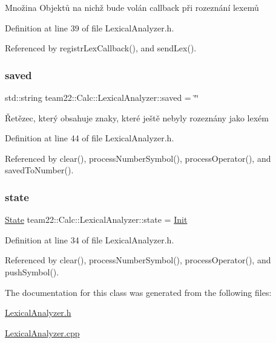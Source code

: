 Množina Objektů na nichž bude volán callback při rozeznání lexemů 

Definition at line 39 of file Lexical\+Analyzer.\+h.



Referenced by registr\+Lex\+Callback(), and send\+Lex().

\mbox{\label{classteam22_1_1_calc_1_1_lexical_analyzer_afd063de2c3d792b5688c863eb5135968}} 
\subsubsection{\texorpdfstring{saved}{saved}}
{\footnotesize\ttfamily std\+::string team22\+::\+Calc\+::\+Lexical\+Analyzer\+::saved = \char`\"{}\char`\"{}\hspace{0.3cm}{\ttfamily [private]}}

Řetězec, který obsahuje znaky, které ještě nebyly rozeznány jako lexém 

Definition at line 44 of file Lexical\+Analyzer.\+h.



Referenced by clear(), process\+Number\+Symbol(), process\+Operator(), and saved\+To\+Number().

\mbox{\label{classteam22_1_1_calc_1_1_lexical_analyzer_ad0f4710b09bf91a00d11846a7ef036ab}} 
\subsubsection{\texorpdfstring{state}{state}}
{\footnotesize\ttfamily \hyperlink{classteam22_1_1_calc_1_1_lexical_analyzer_aef11ba66454715a80d5964c07f6d8cc3}{State} team22\+::\+Calc\+::\+Lexical\+Analyzer\+::state = \hyperlink{classteam22_1_1_calc_1_1_lexical_analyzer_aef11ba66454715a80d5964c07f6d8cc3a11976214c837f23fd71b2af8b0de3d5b}{Init}\hspace{0.3cm}{\ttfamily [private]}}



Definition at line 34 of file Lexical\+Analyzer.\+h.



Referenced by clear(), process\+Number\+Symbol(), process\+Operator(), and push\+Symbol().



The documentation for this class was generated from the following files\+:\begin{DoxyCompactItemize}
\item 
\hyperlink{_lexical_analyzer_8h}{Lexical\+Analyzer.\+h}\item 
\hyperlink{_lexical_analyzer_8cpp}{Lexical\+Analyzer.\+cpp}\end{DoxyCompactItemize}
